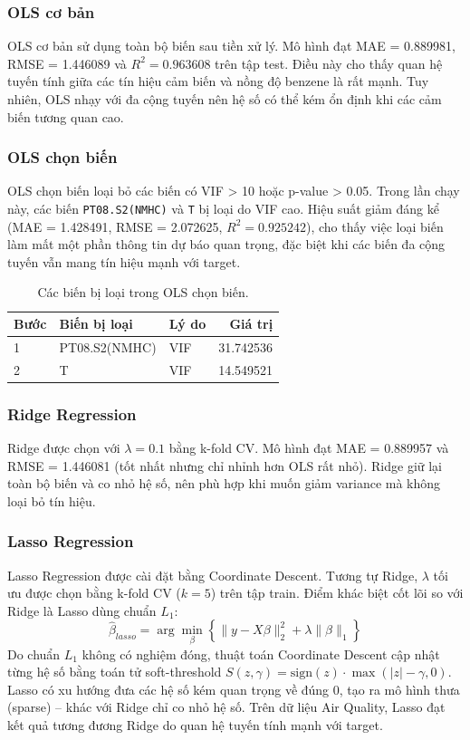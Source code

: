 \documentclass[a4paper]{article}
\begin{document}
\subsubsection{OLS cơ bản}
OLS cơ bản sử dụng toàn bộ biến sau tiền xử lý. Mô hình đạt MAE = 0.889981, RMSE = 1.446089 và $R^2 = 0.963608$ trên tập test. Điều này cho thấy quan hệ tuyến tính giữa các tín hiệu cảm biến và nồng độ benzene là rất mạnh. Tuy nhiên, OLS nhạy với đa cộng tuyến nên hệ số có thể kém ổn định khi các cảm biến tương quan cao.

\subsubsection{OLS chọn biến}
OLS chọn biến loại bỏ các biến có VIF > 10 hoặc p-value > 0.05. Trong lần chạy này, các biến \texttt{PT08.S2(NMHC)} và \texttt{T} bị loại do VIF cao. Hiệu suất giảm đáng kể (MAE = 1.428491, RMSE = 2.072625, $R^2 = 0.925242$), cho thấy việc loại biến làm mất một phần thông tin dự báo quan trọng, đặc biệt khi các biến đa cộng tuyến vẫn mang tín hiệu mạnh với target.

\begin{table}[H]
\centering
\begin{tabular}{l l l r}
\hline
Bước & Biến bị loại & Lý do & Giá trị \\
\hline
1 & PT08.S2(NMHC) & VIF & 31.742536 \\
2 & T & VIF & 14.549521 \\
\hline
\end{tabular}
\caption{Các biến bị loại trong OLS chọn biến.}
\end{table}

\subsubsection{Ridge Regression}
Ridge được chọn với $\lambda=0.1$ bằng k-fold CV. Mô hình đạt MAE = 0.889957 và RMSE = 1.446081 (tốt nhất nhưng chỉ nhỉnh hơn OLS rất nhỏ). Ridge giữ lại toàn bộ biến và co nhỏ hệ số, nên phù hợp khi muốn giảm variance mà không loại bỏ tín hiệu.

\subsubsection{Lasso Regression}
Lasso Regression được cài đặt bằng Coordinate Descent. Tương tự Ridge, $\lambda$ tối ưu được chọn bằng k-fold CV ($k=5$) trên tập train. Điểm khác biệt cốt lõi so với Ridge là Lasso dùng chuẩn $L_1$:
\begin{equation}
\hat{\beta}_{lasso} = \arg\min_{\beta}\left\{\lVert y - X\beta \rVert_2^2 + \lambda \lVert \beta \rVert_1\right\}
\end{equation}
Do chuẩn $L_1$ không có nghiệm đóng, thuật toán Coordinate Descent cập nhật từng hệ số bằng toán tử soft-threshold $S(z,\gamma)=\text{sign}(z)\cdot\max(|z|-\gamma,0)$. Lasso có xu hướng đưa các hệ số kém quan trọng về đúng 0, tạo ra mô hình thưa (sparse) -- khác với Ridge chỉ co nhỏ hệ số. Trên dữ liệu Air Quality, Lasso đạt kết quả tương đương Ridge do quan hệ tuyến tính mạnh với target.
\end{document}
